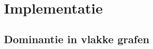 \documentclass[11pt, a4paper]{article}
\begin{document}
\section{Implementatie}
\subsection{Dominantie in vlakke grafen}
\end{document}
